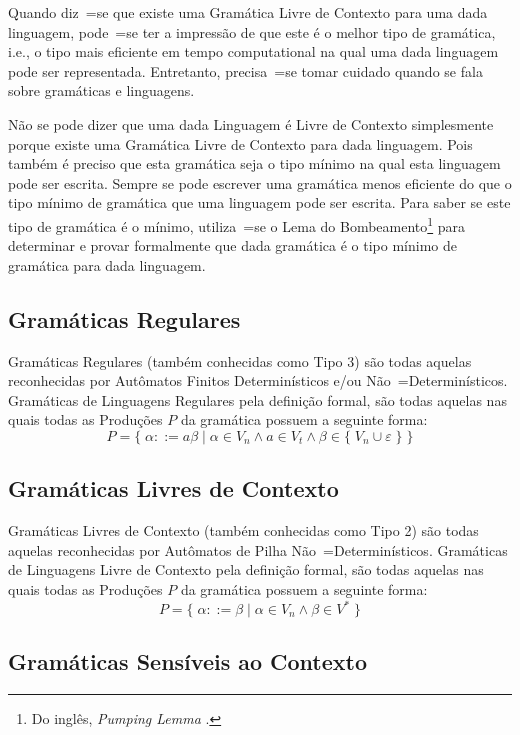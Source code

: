 Quando diz~=se que existe uma Gramática Livre de Contexto para uma dada linguagem,
pode~=se ter a impressão de que este é o melhor tipo de gramática,
i.e.,
o tipo mais eficiente em tempo computational na qual uma dada linguagem pode ser representada.
Entretanto,
precisa~=se tomar cuidado quando se fala sobre gramáticas e
linguagens.

Não se pode dizer que uma dada Linguagem é Livre de Contexto simplesmente porque existe uma Gramática Livre de Contexto para dada linguagem.
Pois também é preciso que esta gramática seja o tipo mínimo na qual esta linguagem pode ser escrita.
Sempre se pode escrever uma gramática menos eficiente do que o tipo mínimo de gramática que uma linguagem pode ser escrita.
Para saber se este tipo de gramática é o mínimo,
utiliza~=se o Lema do Bombeamento\footnote{
Do inglês, \textit{Pumping Lemma} \cite{hopcroftBook,sipserBook}.
}
para determinar e
provar formalmente que dada gramática é o tipo mínimo de gramática para dada linguagem.


\subsection{Gramáticas Regulares}

Gramáticas Regulares (também conhecidas como Tipo 3) são todas aquelas reconhecidas por Autômatos Finitos Determinísticos e\slash{}ou Não~=Determinísticos.
Gramáticas de Linguagens Regulares pela definição formal,
são todas aquelas nas quais todas as Produções $P$ da gramática possuem a seguinte forma:
$$ P = \{\; \alpha ::= a \beta \;|\; \alpha \in V_n \land a \in V_t
            \land \beta \in \{\; V_n \cup \varepsilon\; \} \;\} $$

\subsection{Gramáticas Livres de Contexto}

Gramáticas Livres de Contexto (também conhecidas como Tipo 2) \cite{hopcroftBook} são todas aquelas reconhecidas por Autômatos de Pilha Não~=Determinísticos.
Gramáticas de Linguagens Livre de Contexto pela definição formal,
são todas aquelas nas quais todas as Produções $P$ da gramática possuem a seguinte forma:
$$ P = \{\; \alpha ::= \beta \;|\; \alpha \in V_n \land \beta \in V^* \;\} $$


\subsection{Gramáticas Sensíveis ao Contexto}


